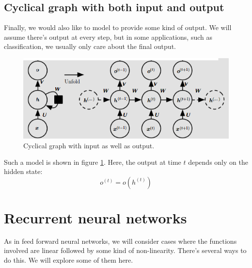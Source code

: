 \documentclass[12pt, a4paper]{article}
\numberwithin{equation}{section}
\begin{document}
\subsection{Cyclical graph with both input and output}
Finally, we would also like to model to provide some kind of output. We will assume there's output at every step, but in some applications, such as classification, we usually only care about the final output. 

\begin{figure}
\centering
\includegraphics[width=\textwidth]{cyclical_input_output}
\caption{Cyclical graph with input as well as output.}
\label{fig:cyclical_input_output}
\end{figure}

Such a model is shown in figure \ref{fig:cyclical_input_output}. Here, the output at time $t$ depends only on the hidden state:
\begin{equation}
o^{(t)}=o(h^{(t)})
\end{equation}

\section{Recurrent neural networks}
As in feed forward neural networks, we will consider cases where the functions involved are linear followed by some kind of non-linearity. There's several ways to do this. We will explore some of them here.
\end{document}
